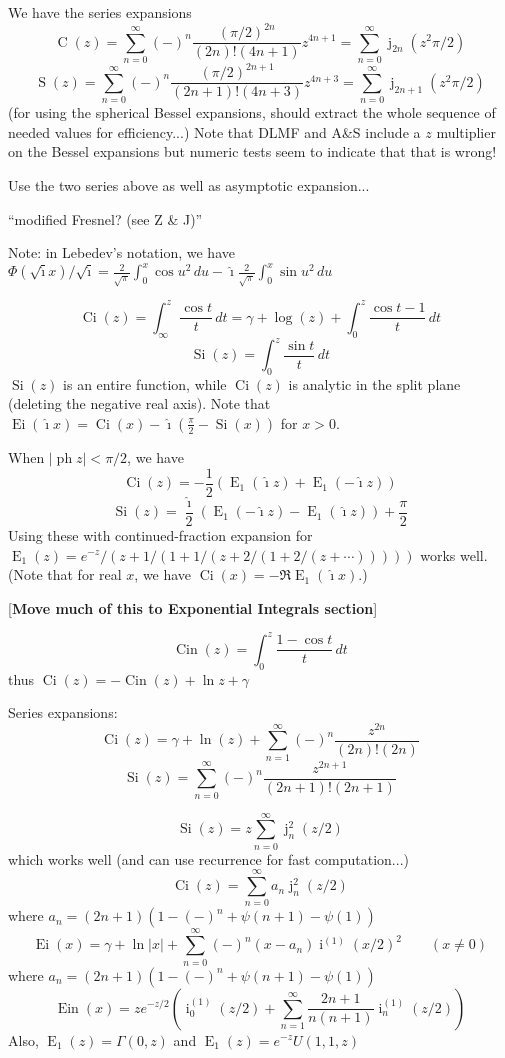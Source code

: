 \documentclass[10pt,dvipdfmx,letterpaper,twoside]{article}
\let\O=\operatorname
\newcommand{\ii}{{\hat{\imath}}}
\newenvironment{implementation}{\noindent\begin{framed}}{\end{framed}}
\let\gam=\gamma
\let\Gam=\Gamma
\begin{document}
We have the series expansions
\[ \O{C}(z) = \sum_{n=0}^\infty(-)^n\frac{(\pi/2)^{2n}}{(2n)!(4n+1)}z^{4n+1}
    = \sum_{n=0}^\infty \O{j}_{2n}(z^2\pi/2) \]
\[ \O{S}(z) = \sum_{n=0}^\infty(-)^n\frac{(\pi/2)^{2n+1}}{(2n+1)!(4n+3)}z^{4n+3}
    = \sum_{n=0}^\infty \O{j}_{2n+1}(z^2\pi/2) \]
(for using the spherical Bessel expansions, should extract the whole sequence of needed values for efficiency...)
Note that DLMF and A\&S include a $z$ multiplier on the Bessel expansions but numeric tests seem to indicate that that
is wrong!
\begin{implementation}
Use the two series above as well as asymptotic expansion...
\end{implementation}

``modified Fresnel? (see Z \& J)''

Note: in Lebedev's notation, we have
$\Phi(\sqrt\ii x)/\sqrt\ii = \frac{2}{\sqrt\pi}\int_0^x\cos u^2\,du -  \ii\frac{2}{\sqrt\pi}\int_0^x\sin u^2\,du$

\[ \O{Ci}(z) = \int_\infty^z\frac{\cos t}{t}\,dt = \gam + \log(z) + \int_0^z \frac{\cos t - 1}{t}\,dt \]
\[ \O{Si}(z) = \int_0^z \frac{\sin t}{t}\,dt \]
$\O{Si}(z)$ is an entire function, while $\O{Ci}(z)$ is analytic in the split plane (deleting the negative real axis).
Note that $\O{Ei}(\ii x) = \O{Ci}(x) - \ii(\frac\pi2 - \O{Si}(x))$ for $x>0$.

When $|\O{ph} z| < \pi/2$, we have
\[ \O{Ci}(z) = -\frac12\left( \O{E}_1(\ii z) + \O{E}_1(-\ii z) \right) \]
\[ \O{Si}(z) = \frac\ii2\left( \O{E}_1(-\ii z) - \O{E}_1(\ii z) \right) + \frac\pi2 \]
Using these with continued-fraction expansion for $\O{E}_1(z) = e^{-z}/(z+1/(1+1/(z+2/(1+2/(z+\cdots)))))$ works well.
(Note that for real $x$, we have $\O{Ci}(x) = -\Re \O{E}_1(\ii x)$.)

[{\bf Move much of this to Exponential Integrals section}]

\[ \O{Cin}(z) = \int_0^z\frac{1-\cos t}{t}\,dt \]
thus $\O{Ci}(z) = -\O{Cin}(z) + \ln z + \gam$

Series expansions:
\[ \O{Ci}(z) = \gamma + \ln(z) + \sum_{n=1}^\infty (-)^n \frac{z^{2n}}{(2n)!(2n)} \]
\[ \O{Si}(z) = \sum_{n=0}^\infty (-)^n \frac{z^{2n+1}}{(2n+1)!(2n+1)} \]

\[ \O{Si}(z) = z\sum_{n=0}^\infty \O{j}^2_n(z/2) \]
which works well (and can use recurrence for fast computation...)
\[ \O{Ci}(z) = \sum_{n=0}^\infty a_n\O{j}^2_n(z/2) \]
where $a_n = (2n+1)\left(1 - (-)^n + \psi(n+1) - \psi(1)\right)$
\[ \O{Ei}(x) = \gam + \ln|x| + \sum_{n=0}^\infty (-)^n (x-a_n) \O{i}^{(1)}(x/2)^2 \qquad (x\neq 0) \]
where $a_n = (2n+1)\left(1 - (-)^n + \psi(n+1) - \psi(1)\right)$
\[ \O{Ein}(x) = z e^{-z/2}\left( \O{i}^{(1)}_0(z/2) + \sum_{n=1}^\infty \frac{2n+1}{n(n+1)} \O{i}^{(1)}_n(z/2) \right) \]
Also, $\O{E}_1(z) = \Gam(0,z)$ and $\O{E}_1(z) = e^{-z} U(1,1,z)$
\end{document}
